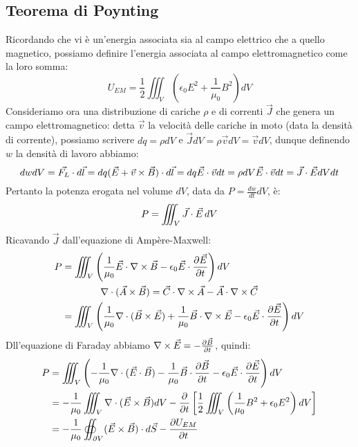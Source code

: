 \subsection{Teorema di Poynting}

Ricordando che vi è un'energia associata sia al campo elettrico che a quello magnetico, possiamo definire l'energia associata al campo elettromagnetico come la loro somma:
\begin{equation}
	U_{EM} = \frac{1}{2} \iiint_V \left( \epsilon_0 E^2 + \frac{1}{\mu_0} B^2\right) dV
	\label{eq:29}
\end{equation}
%
Consideriamo ora una distribuzione di cariche $ \rho $ e di correnti $ \vec{J} $ che genera un campo elettromagnetico: detta $ \vec{v} $ la velocità delle cariche in moto (data la densità di corrente), possiamo scrivere $ dq = \rho dV $ e $ \vec{J} dV = \rho \vec{v} dV = \vec{v} dV $, dunque definendo $ w $ la densità di lavoro abbiamo:
\begin{equation}
	dw dV = \vec{F_L} \cdot d\vec{l} = dq (\vec{E} + \vec{v}\times\vec{B})\cdot d\vec{l} = dq \vec{E}\cdot\vec{v} dt = \rho dV \vec{E}\cdot\vec{v} dt = \vec{J}\cdot\vec{E} dV dt
	\label{eq:30}
\end{equation}
Pertanto la potenza erogata nel volume $ dV $, data da $ P = \frac{dw}{dt} dV $, è:
\begin{equation}
	P = \iiint_V \vec{J}\cdot\vec{E} \,dV
	\label{eq:31}
\end{equation}
Ricavando $ \vec{J} $ dall'equazione di Ampère-Maxwell:
\begin{equation}
	\begin{split}
		P &= \iiint_V \left(\frac{1}{\mu_0} \vec{E} \cdot \nabla\times\vec{B} - \epsilon_0 \vec{E} \cdot \frac{\partial\vec{E}}{\partial t}\right) dV \\ 
		  &\qquad\qquad \nabla\cdot(\vec{A}\times\vec{B}) = \vec{C} \cdot \nabla\times\vec{A} - \vec{A} \cdot \nabla\times\vec{C} \\ 
		  &= \iiint_V \left(\frac{1}{\mu_0} \nabla\cdot(\vec{B}\times\vec{E}) + \frac{1}{\mu_0} \vec{B} \cdot \nabla\times\vec{E} - \epsilon_0 \vec{E} \cdot \frac{\partial\vec{E}}{\partial t}\right) dV
	\end{split}
	\label{eq:32}
\end{equation}
Dll'equazione di Faraday abbiamo $ \nabla\times\vec{E} = - \frac{\partial\vec{B}}{\partial t} $, quindi:
\begin{equation}
	\begin{split}
		P &= \iiint_V \left( - \frac{1}{\mu_0} \nabla\cdot(\vec{E}\cdot\vec{B}) - \frac{1}{\mu_0} \vec{B} \cdot \frac{\partial\vec{B}}{\partial t} - \epsilon_0 \vec{E} \cdot \frac{\partial\vec{E}}{\partial t}\right) dV \\ 
		  &= - \frac{1}{\mu_0} \iiint_V \nabla\cdot(\vec{E}\times\vec{B}) dV - \frac{\partial}{\partial t} \left[\frac{1}{2} \iiint_V \left(\frac{1}{\mu_0} B^2 + \epsilon_0 E^2\right) dV \right] \\ 
		  &= - \frac{1}{\mu_0} \oiint_{\partial V} (\vec{E}\times\vec{B})\cdot d\vec{S} - \frac{\partial U_{EM}}{\partial t}
	\end{split}
	\label{eq:33}
\end{equation}
